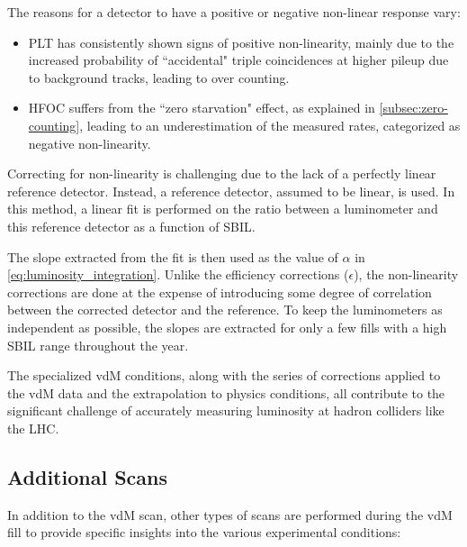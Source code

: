 The reasons for a detector to have a positive or negative non-linear response vary:

\begin{itemize}
    \item PLT has consistently shown signs of positive non-linearity, mainly due to the increased probability of ``accidental" triple coincidences at higher pileup due to background tracks, leading to over counting.
    \item HFOC suffers from the ``zero starvation" effect, as explained in \autoref{subsec:zero-counting}, leading to an underestimation of the measured rates, categorized as negative non-linearity.
\end{itemize}

Correcting for non-linearity is challenging due to the lack of a perfectly linear reference detector. Instead, a reference detector, assumed to be linear, is used. In this method, a linear fit is performed on the ratio between a luminometer and this reference detector as a function of SBIL. 

The slope extracted from the fit is then used as the value of \(\alpha\) in \autoref{eq:luminosity_integration}. Unlike the efficiency corrections (\(\epsilon\)), the non-linearity corrections are done at the expense of introducing some degree of correlation between the corrected detector and the reference. To keep the luminometers as independent as possible, the slopes are extracted for only a few fills with a high SBIL range throughout the year.

The specialized vdM conditions, along with the series of corrections applied to the vdM data and the extrapolation to physics conditions, all contribute to the significant challenge of accurately measuring luminosity at hadron colliders like the LHC.

\subsection{Additional Scans}

In addition to the vdM scan, other types of scans are performed during the vdM fill to provide specific insights into the various experimental conditions:

